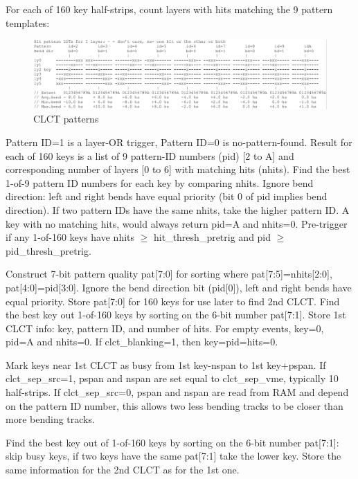 For each of 160 key half-strips, count layers with hits matching the 9 pattern templates:

\begin{figure}[tbh]
        \begin{center}
                \includegraphics[width=0.98\linewidth]{figures/CLCT_patterns.png}
                \caption{CLCT patterns}
                \label{fig:clct_patterns}
        \end{center}
\end{figure}

Pattern ID=1 is a layer-OR trigger, Pattern ID=0 is no-pattern-found. Result for each of 160 keys is a list of 9 pattern-ID numbers (pid) [2 to A] and corresponding
number of layers [0 to 6] with matching hits (nhits). Find the best 1-of-9 pattern ID numbers for each key by comparing nhits. Ignore bend direction: left and right bends have equal priority (bit 0 of pid implies bend direction).
If two pattern IDs have the same nhits, take the higher pattern ID. A key with no matching hits, would always return pid=A and nhits=0.
Pre-trigger if any 1-of-160 keys have nhits $\geq$ hit\_thresh\_pretrig and pid $\geq$ pid\_thresh\_pretrig.

Construct 7-bit pattern quality pat[7:0] for sorting where pat[7:5]=nhits[2:0], pat[4:0]=pid[3:0]. Ignore the bend direction bit (pid[0]), left and right bends have equal priority. 
Store pat[7:0] for 160 keys for use later to find 2nd CLCT.
Find the best key out 1-of-160 keys by sorting on the 6-bit number pat[7:1]. Store 1st CLCT info: key, pattern ID, and number of hits.
For empty events, key=0, pid=A and nhits=0. If clct\_blanking=1, then key=pid=hits=0.

Mark keys near 1st CLCT as busy from 1st key-nspan to 1st key+pspan.
If clct\_sep\_src=1, pspan and nspan are set equal to clct\_sep\_vme, typically 10 half-strips.
If clct\_sep\_src=0, pspan and nspan are read from RAM and depend on the pattern ID number, this allows two less bending tracks to be closer than more bending tracks.

Find the best key out of 1-of-160 keys by sorting on the 6-bit number pat[7:1]: skip busy keys, if two keys have the same pat[7:1] take the lower key.
Store the same information for the 2nd CLCT as for the 1st one.

